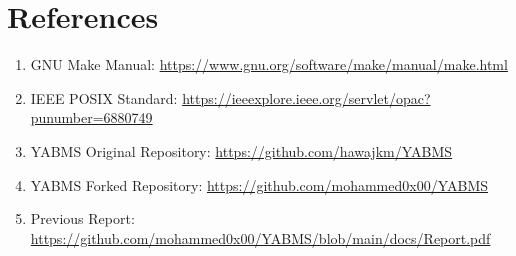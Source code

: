 \documentclass[12pt]{article}
\begin{document}
\section{References}
\begin{enumerate}
    \item GNU Make Manual: \url{https://www.gnu.org/software/make/manual/make.html}
    \item IEEE POSIX Standard: \url{https://ieeexplore.ieee.org/servlet/opac?punumber=6880749}
    \item YABMS Original Repository: \url{https://github.com/hawajkm/YABMS}
    \item YABMS Forked Repository: \url{https://github.com/mohammed0x00/YABMS}
    \item Previous Report: \url{https://github.com/mohammed0x00/YABMS/blob/main/docs/Report.pdf}
\end{enumerate}
\end{document}
